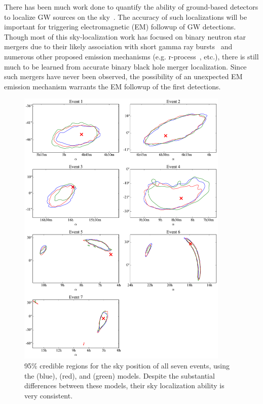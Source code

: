 There has been much work done to quantify the ability of ground-based detectors
to localize GW sources on the
sky~\cite{Veitch:2012df,Aasi:2013wya,Nissanke:2011ax,Fairhurst:2010is}.  The
accuracy of such localizations will be important for triggering electromagnetic
(EM) followup of GW detections.  Though most of this sky-localization work has 
focused on binary
neutron star mergers due to their likely association with short gamma ray
bursts~\cite{Eichler:1989ve,Narayan:1992iy,Fong:2013iia} and numerous other
proposed emission mechanisms (e.g.  r-process~\cite{Rosswog:2000qm}, etc.),
there is still much to be learned from accurate binary black hole merger
localization.  Since such mergers have never been observed, the possibility of
an unexpected EM emission mechanism warrants the EM followup of the first
detections.

\begin{figure}[t]
  \includegraphics[width=0.9\textwidth]{papers/mdc2013_submission/figure10}
  \caption{\label{fig:PE_skyLoc} 95\% credible regions for the sky position
      of all seven events, using the \eob (blue), \imrns (red), and \imr (green)
      models.  Despite the substantial differences between these models,
      their sky localization ability is very consistent.}
\end{figure}


